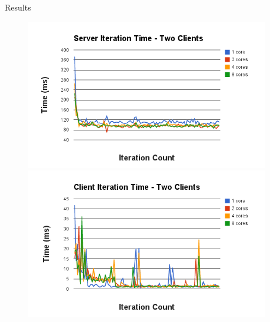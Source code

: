 \documentclass[final]{beamer}
\newlength{\sepwid}
\newlength{\twocolwid}
\begin{document}
\begin{frame}[t]
\begin{columns}[t]
\begin{column}{\twocolwid}
\begin{columns}[t,totalwidth=\twocolwid]
\begin{column}{\twocolwid}
\begin{block}{Results}
\begin{figure}[!htb]
  \includegraphics[width=\linewidth]{server-2.png}
\endminipage\hfill
{}
  \includegraphics[width=\linewidth]{client-2.png}
\endminipage\hfill
\end{figure}

\end{block}


\end{column} %

\end{columns} %

\end{column} %

\begin{column}{\sepwid}\end{column} %


\end{columns}
\end{frame}
\end{document}
